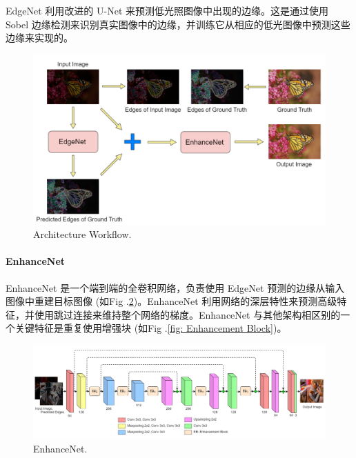 \documentclass[letterpaper,10pt]{article}
\begin{document}
			EdgeNet 利用改进的 U-Net 来预测低光照图像中出现的边缘。这是通过使用 Sobel 边缘检测来识别真实图像中的边缘，并训练它从相应的低光图像中预测这些边缘来实现的。
			
			\begin{figure}[htbp]
				\centering 
				\includegraphics[width=0.6\columnwidth]{picture/LLIE/EdgeNet/Archtecture workflow}
				\caption{
					\label{fig: Archtecture workflow} 
					Architecture Workflow.
				}
			\end{figure}
			
			\paragraph{EnhanceNet}
			
			EnhanceNet 是一个端到端的全卷积网络，负责使用 EdgeNet 预测的边缘从输入图像中重建目标图像 (如Fig .\ref{fig: EnhanceNet})。EnhanceNet 利用网络的深层特性来预测高级特征，并使用跳过连接来维持整个网络的梯度。EnhanceNet 与其他架构相区别的一个关键特征是重复使用增强块 (如Fig .\ref{fig: Enhancement Block})。
			
			\begin{figure}[htbp]
				\centering 
				\includegraphics[width=\columnwidth]{picture/LLIE/EdgeNet/EnhanceNet}
				\caption{
					\label{fig: EnhanceNet} 
					EnhanceNet.
				}
			\end{figure}
						
\end{document}
